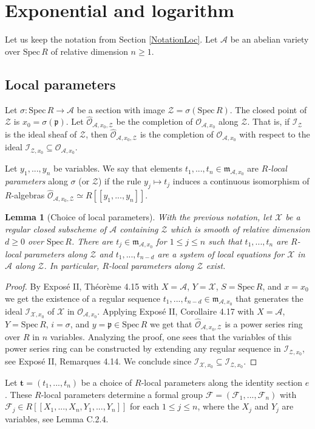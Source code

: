 \documentclass[11pt]{amsart}
\newtheorem{lemma}[theorem]{Lemma}
\theoremstyle{remark}
\numberwithin{equation}{section}
\newcommand{\pfrak}{\mathfrak{p}}
\newcommand{\mfrak}{\mathfrak{m}}
\newcommand{\Acal}{\mathscr{A}}
\newcommand{\Fcal}{\mathscr{F}}
\newcommand{\Ical}{\mathscr{I}}
\newcommand{\Ocal}{\mathscr{O}}
\newcommand{\Xcal}{\mathscr{X}}
\newcommand{\Zcal}{\mathscr{Z}}
\newcommand{\ttt}{\mathbf{t}}
\newcommand{\Spec}{\mathrm{Spec}\,}
\begin{document}
\section{Exponential and logarithm} \label{SecLogExp}

Let us keep the notation from Section \ref{NotationLoc}. Let $\Acal$ be an abelian variety over $\Spec R$ of relative dimension $n\ge 1$. 
\subsection{Local parameters} \label{SecLogExp1}


Let $\sigma:\Spec R\to \Acal$ be a section with image $\Zcal=\sigma(\Spec R)$. The closed point of $\Zcal$ is $x_0=\sigma(\pfrak)$. Let $\widehat{\Ocal}_{\Acal ,x_0,\Zcal}$ be the completion of $\Ocal_{\Acal,x_0}$ along $\Zcal$.  That is, if $\Ical_\Zcal$ is the ideal sheaf of $\Zcal$, then $\widehat{\Ocal}_{\Acal ,x_0,\Zcal}$ is the completion of $\Ocal_{\Acal,x_0}$ with respect to the ideal $\Ical_{\Zcal,x_0}\subseteq\Ocal_{\Acal,x_0}$.  

 Let $y_1,...,y_n$ be variables. We say that elements $t_1,...,t_n\in \mfrak_{\Acal,x_0}$  are \emph{$R$-local parameters} along $\sigma$ (or $\Zcal$) if the rule $y_j\mapsto t_j$ induces a continuous isomorphism of $R$-algebras $\widehat{\Ocal}_{\Acal,x_0,\Zcal}\simeq R[[y_1,...,y_n]]$.
\begin{lemma}[Choice of local parameters]\label{LemmaChoiceLocParam} With the previous notation, let $\Xcal$ be a regular closed subscheme of $\Acal$ containing $\Zcal$ which is smooth of relative dimension $d\ge 0$ over $\Spec R$.  There are $t_j\in \mfrak_{\Acal,x_0}$ for $1\le j\le n$ such that $t_1,...,t_n$ are $R$-local parameters along $\Zcal$ and $t_1,...,t_{n-d}$ are a system of local equations for $\Xcal$ in $\Acal$ along $\Zcal$. In particular, $R$-local parameters along $\Zcal$ exist.
\end{lemma}
\begin{proof} By \cite{SGA1} Expos\'e II, Th\'eor\`eme 4.15 with $X=\Acal$, $Y=\Xcal$, $S=\Spec R$, and $x=x_0$  we get the existence of  a regular sequence $t_1,...,t_{n-d}\in \mfrak_{\Acal,x_0}$ that generates the ideal $\Ical_{\Xcal, x_0}$ of $\Xcal$ in $\Ocal_{\Acal, x_0}$. Applying \cite{SGA1} Expos\'e II, Corollaire 4.17 with $X=\Acal$, $Y=\Spec R$, $i=\sigma$, and $y=\pfrak\in \Spec R$ we get that  $\widehat{\Ocal}_{\Acal,x_0,\Zcal}$ is a power series ring over $R$ in $n$ variables. Analyzing the proof, one sees that the variables of this power series ring can be constructed by extending any regular sequence in $\Ical_{\Zcal, x_0}$, see \cite{SGA1} Expos\'e II, Remarques  4.14. We conclude since $\Ical_{\Xcal,x_0}\subseteq \Ical_{\Zcal,x_0}$.
\end{proof}
Let $\ttt=(t_1,...,t_n)$ be a choice of $R$-local parameters along the identity section $e$. These $R$-local parameters determine a formal group $\Fcal=(\Fcal_1,...,\Fcal_n)$ with $\Fcal_j\in R[[X_1,...,X_n,Y_1,...,Y_n]]$ for each $1\le j\le n$, where the $X_j$ and $Y_j$ are variables, see \cite{SilvermanHindry} Lemma C.2.4. 
\end{document}
